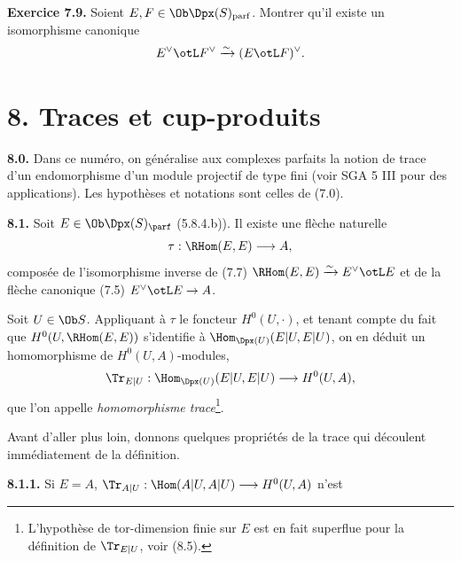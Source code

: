 \textbf{Exercice 7.9.} Soient \(E,F\in\Ob\Dpx(S)_{\mathrm{parf}}\). Montrer qu'il existe un isomorphisme canonique
\[
  E^\vee\otL F^\vee \xrightarrow{\sim} (E\otL F)^\vee .
\]

\section*{8. Traces et cup-produits}

\textbf{8.0.} Dans ce numéro, on généralise aux complexes parfaits la notion de trace d'un endomorphisme d'un module projectif de type fini (voir SGA 5 III pour des applications). Les hypothèses et notations sont celles de (7.0).

\textbf{8.1.} Soit \(E\in\Ob\Dpx(S)_{\parf}\) (5.8.4.b)). Il existe une flèche naturelle
\[
  \tau:\RHom(E,E)\longrightarrow A,
\]
composée de l'isomorphisme inverse de (7.7) \(\RHom(E,E)\xrightarrow{\sim}E^\vee\otL E\) et de la flèche canonique (7.5) \(E^\vee\otL E\to A\).

Soit \(U\in\Ob S\). Appliquant à \(\tau\) le foncteur \(H^0(U,\cdot)\), et tenant compte du fait que \(H^0(U,\RHom(E,E))\) s'identifie à \(\Hom_{\Dpx(U)}(E|U,E|U)\), on en déduit un homomorphisme de \(H^0(U,A)\)-modules,
\[
  \Tr_{E|U}:\Hom_{\Dpx(U)}(E|U,E|U)\longrightarrow H^0(U,A),
\]
que l'on appelle \emph{homomorphisme trace}\footnote{L'hypothèse de tor-dimension finie sur \(E\) est en fait superflue pour la définition de \(\Tr_{E|U}\), voir (8.5).}.

Avant d'aller plus loin, donnons quelques propriétés de la trace qui découlent immédiatement de la définition.

\textbf{8.1.1.} Si \(E=A\), \(\Tr_{A|U}:\Hom(A|U,A|U)\longrightarrow H^0(U,A)\) n'est
